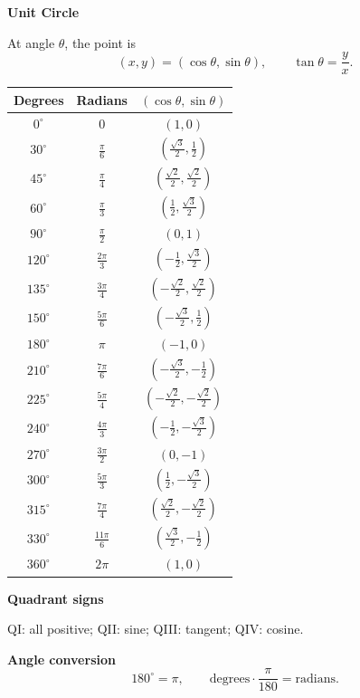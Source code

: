 \documentclass[10pt]{article}
\begin{document}
\small

\begin{minipage}[t]{0.49\textwidth}
\textbf{Unit Circle}\par
At angle $\theta$, the point is
\[
(x,y)=(\cos\theta,\sin\theta),\qquad \tan\theta=\frac{y}{x}.
\]

\centering
\renewcommand{\arraystretch}{1.1}
\begin{tabular}{c c c}
\toprule
Degrees & Radians & $(\cos\theta,\sin\theta)$\\
\midrule
$0^\circ$ & $0$ & $(1,0)$\\
$30^\circ$ & $\frac{\pi}{6}$ & $(\frac{\sqrt3}{2},\frac12)$\\
$45^\circ$ & $\frac{\pi}{4}$ & $(\frac{\sqrt2}{2},\frac{\sqrt2}{2})$\\
$60^\circ$ & $\frac{\pi}{3}$ & $(\frac12,\frac{\sqrt3}{2})$\\
$90^\circ$ & $\frac{\pi}{2}$ & $(0,1)$\\
$120^\circ$ & $\frac{2\pi}{3}$ & $(-\frac12,\frac{\sqrt3}{2})$\\
$135^\circ$ & $\frac{3\pi}{4}$ & $(-\frac{\sqrt2}{2},\frac{\sqrt2}{2})$\\
$150^\circ$ & $\frac{5\pi}{6}$ & $(-\frac{\sqrt3}{2},\frac12)$\\
$180^\circ$ & $\pi$ & $(-1,0)$\\
$210^\circ$ & $\frac{7\pi}{6}$ & $(-\frac{\sqrt3}{2},-\frac12)$\\
$225^\circ$ & $\frac{5\pi}{4}$ & $(-\frac{\sqrt2}{2},-\frac{\sqrt2}{2})$\\
$240^\circ$ & $\frac{4\pi}{3}$ & $(-\frac12,-\frac{\sqrt3}{2})$\\
$270^\circ$ & $\frac{3\pi}{2}$ & $(0,-1)$\\
$300^\circ$ & $\frac{5\pi}{3}$ & $(\frac12,-\frac{\sqrt3}{2})$\\
$315^\circ$ & $\frac{7\pi}{4}$ & $(\frac{\sqrt2}{2},-\frac{\sqrt2}{2})$\\
$330^\circ$ & $\frac{11\pi}{6}$ & $(\frac{\sqrt3}{2},-\frac12)$\\
$360^\circ$ & $2\pi$ & $(1,0)$\\
\bottomrule
\end{tabular}

\raggedright
\textbf{Quadrant signs}\par
QI: all positive; QII: sine; QIII: tangent; QIV: cosine.

\textbf{Angle conversion}
\[
180^\circ=\pi,\qquad
\text{degrees}\cdot\frac{\pi}{180}=\text{radians}.
\]
\end{minipage}
\end{document}
